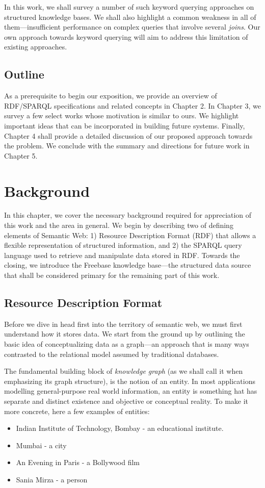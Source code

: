\documentclass[a4paper, twoside, 12pt]{report}
\begin{document}
In this work, we shall survey a number of such keyword querying approaches on structured knowledge bases. We shall also highlight a common weakness in all of them---insufficient performance on complex queries that involve several \emph{joins}. Our own approach towards keyword querying will aim to address this limitation of existing approaches.

\section{Outline}

As a prerequisite to begin our exposition, we provide  an overview of RDF/SPARQL specifications and related concepts in Chapter 2. In Chapter 3, we survey a few select works whose motivation is similar to ours. We highlight important ideas that can be incorporated in building future systems. Finally, Chapter 4 shall provide a detailed discussion of our proposed approach towards the problem. We conclude with the summary and directions for future work in Chapter 5.


\chapter{Background}


In this chapter, we cover the necessary background required for appreciation of this work and the area in general. We begin by describing two of defining elements of Semantic Web: 1) Resource Description Format (RDF) that allows a flexible representation of structured information, and 2) the SPARQL query language used to retrieve and manipulate data stored in RDF. Towards the closing, we introduce the Freebase knowledge base---the structured data source that shall be considered primary for the remaining part of this work.


\section[RDF]{Resource Description Format}

Before we dive in head first into the territory of semantic web, we must first understand how it stores data. We start from the ground up by outlining the basic idea of conceptualizing data as a graph---an approach that is many ways contrasted to the relational model assumed by traditional databases.

The fundamental building block of \emph{knowledge graph} (as we shall call it when emphasizing its graph structure), is the notion of an entity. In most applications modelling general-purpose real world information, an entity is something hat has separate and distinct existence and objective or conceptual reality. To make it more concrete, here a few examples of entities:
\begin{itemize}
  \item Indian Institute of Technology, Bombay - an educational institute.
  \item Mumbai - a city
  \item An Evening in Paris - a Bollywood film
  \item Sania Mirza - a person
\end{itemize}
\end{document}
